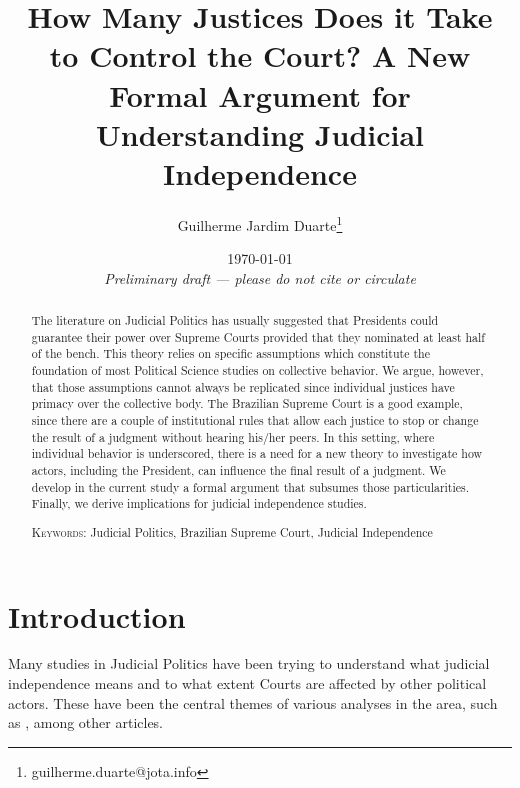 \documentclass[12pt, a4paper]{article}
\title{\textbf{How Many Justices Does it Take to Control the Court?} A New Formal Argument for Understanding Judicial Independence}
\author{Guilherme Jardim Duarte\thanks{guilherme.duarte@jota.info}}
\date{\vspace{.5cm} \today \\ 
\vspace{.5cm} \textit{Preliminary draft --- please do not cite or circulate}}
\begin{document}
\doublespacing
\maketitle

\begin{abstract}


The literature on Judicial Politics has usually suggested that Presidents could guarantee their power over Supreme Courts provided that they nominated at least half of the bench. This theory relies on specific assumptions which
constitute the foundation of most Political Science studies on collective behavior. We argue, however, that those assumptions cannot always be replicated since individual justices have primacy over the collective body. The Brazilian Supreme Court is a good example, since there are a couple of institutional rules that allow
each justice to stop or change the result of a judgment without hearing his/her peers. In this setting, where individual behavior is underscored, there is a need for
a new theory to investigate how actors, including the President, can
influence the final result of a judgment. We develop in the current study a formal argument that subsumes those particularities. Finally, we derive implications for judicial independence studies. 


\vspace{.5cm}
\noindent
\textsc{Keywords}: Judicial Politics, Brazilian Supreme Court, Judicial Independence
\end{abstract}

\newpage

	\doublespacing

\section{Introduction}
  

Many studies in Judicial Politics have been trying to understand what judicial independence means and to what extent Courts are affected by other political actors. These have been the central themes 
of various analyses in the area, such as \citet{ferejohn1998independent,hanssen2004there,helmke2009regimes,helmke2014inducing,ginsburg2014does}, among other  articles. 
\end{document}
